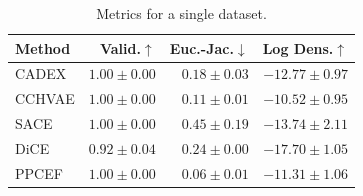 \begin{table}[h]
\centering
\caption{Metrics for a single dataset.}
\label{tab:single_dataset_metrics}
\begin{center}
\begin{sc}
\begin{scriptsize}
\begin{tabular}{l|rrr}
\toprule
Method & Valid.$\uparrow$ & Euc.-Jac.$\downarrow$ & Log Dens.$\uparrow$ \\
\midrule
CADEX & $\boldsymbol{1.00\pm{0.00}}$ & $0.18\pm{0.03}$ & $-12.77\pm{0.97}$ \\
CCHVAE & $\boldsymbol{1.00\pm{0.00}}$ & $0.11\pm{0.01}$ & $\boldsymbol{-10.52\pm{0.95}}$ \\
SACE & $\boldsymbol{1.00\pm{0.00}}$ & $0.45\pm{0.19}$ & $-13.74\pm{2.11}$ \\
DiCE & $0.92\pm{0.04}$ & $0.24\pm{0.00}$ & $-17.70\pm{1.05}$ \\
PPCEF & $\boldsymbol{1.00\pm{0.00}}$ & $\boldsymbol{0.06\pm{0.01}}$ & $-11.31\pm{1.06}$ \\
\bottomrule
\end{tabular}
\end{scriptsize}
\end{sc}
\end{center}
\end{table}
